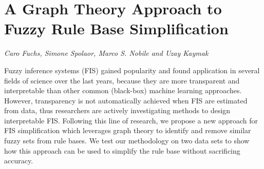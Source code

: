 \documentclass[../booklet.tex]{subfiles}
\begin{document}
\section[A Graph Theory Approach to Fuzzy Rule Base Simplification. {\it Caro Fuchs, Simone Spolaor, Marco S. Nobile and Uzay Kaymak}]{A Graph Theory Approach to Fuzzy Rule Base Simplification}
   

\begin{center}
  {\it Caro Fuchs, Simone Spolaor, Marco S. Nobile and Uzay Kaymak}
\end{center}

\vskip 0.8cm


Fuzzy inference systems (FIS) gained popularity and found application in several fields of science over the last years, because they are more transparent and interpretable than other common (black-box) machine learning approaches.
However, transparency is not automatically achieved when FIS are estimated from data, thus researchers are actively investigating methods to design interpretable FIS.
Following this line of research, we propose a new approach for FIS simplification which leverages graph theory to identify and remove similar fuzzy sets from rule bases.
We test our methodology on two data sets to show how this approach can be used to simplify the rule base without sacrificing accuracy.

\end{document}
